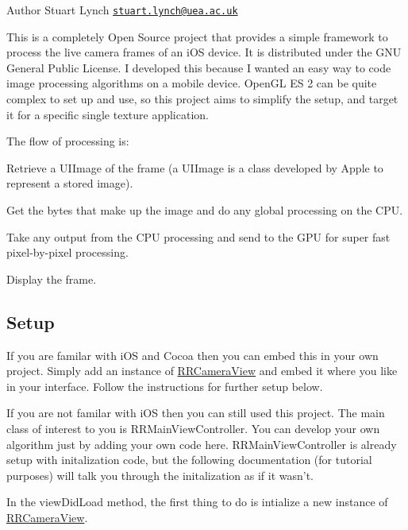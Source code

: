 \begin{DoxyAuthor}{Author}
Stuart Lynch \href{mailto:stuart.lynch@uea.ac.uk}{\tt stuart.\-lynch@uea.\-ac.\-uk}
\end{DoxyAuthor}
This is a completely Open Source project that provides a simple framework to process the live camera frames of an i\-O\-S device. It is distributed under the G\-N\-U General Public License. I developed this because I wanted an easy way to code image processing algorithms on a mobile device. Open\-G\-L E\-S 2 can be quite complex to set up and use, so this project aims to simplify the setup, and target it for a specific single texture application.

The flow of processing is\-:


\begin{DoxyEnumerate}
\item Retrieve a U\-I\-Image of the frame (a U\-I\-Image is a class developed by Apple to represent a stored image).
\item Get the bytes that make up the image and do any global processing on the C\-P\-U.
\item Take any output from the C\-P\-U processing and send to the G\-P\-U for super fast pixel-\/by-\/pixel processing.
\item Display the frame.
\end{DoxyEnumerate}

\subsection*{Setup}

If you are familar with i\-O\-S and Cocoa then you can embed this in your own project. Simply add an instance of \hyperlink{interface_r_r_camera_view}{R\-R\-Camera\-View} and embed it where you like in your interface. Follow the instructions for further setup below.

If you are not familar with i\-O\-S then you can still used this project. The main class of interest to you is R\-R\-Main\-View\-Controller. You can develop your own algorithm just by adding your own code here. R\-R\-Main\-View\-Controller is already setup with initalization code, but the following documentation (for tutorial purposes) will talk you through the initalization as if it wasn't.

In the {\ttfamily view\-Did\-Load} method, the first thing to do is intialize a new instance of \hyperlink{interface_r_r_camera_view}{R\-R\-Camera\-View}.

